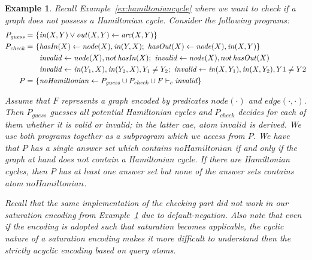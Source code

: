 \documentclass[11pt,fleqn,twoside]{article}
\def\naf{\ensuremath{\mathop{not}}}
\newtheorem{example}{Example}
\begin{document}
			\begin{example}
				\label{ex:hamiltoniancycleqa}
				Recall Example~\ref{ex:hamiltoniancycle} where we want to check if a graph does not possess a Hamiltonian cycle.
				Consider the following programs:
				\begin{align}
					P_{\mathit{guess}} = & \ \{ \mathit{in}(X,Y) \vee \mathit{out}(X,Y) \leftarrow \mathit{arc}(X,Y) \} \label{ex:hamiltoniancycleqa:1} \\
					P_{\mathit{check}} = & \ \{ \mathit{hasIn}(X) \leftarrow \mathit{node}(X), \mathit{in}(Y,X); \ \mathit{hasOut}(X) \leftarrow \mathit{node}(X), \mathit{in}(X,Y) \} \label{ex:hamiltoniancycleqa:2} \\
										& \ \phantom{\{} \mathit{invalid} \leftarrow \mathit{node}(X), \naf \mathit{hasIn}(X); \ \mathit{invalid} \leftarrow \mathit{node}(X), \naf \mathit{hasOut}(X) \label{ex:hamiltoniancycleqa:5} \\
										& \ \phantom{\{} \mathit{invalid} \leftarrow \mathit{in}(Y_1,X), \mathit{in}(Y_2,X), Y_1 \not= Y_2; \ \mathit{invalid} \leftarrow \mathit{in}(X,Y_1), \mathit{in}(X,Y_2), Y1 \not= Y2 \label{ex:hamiltoniancycleqa:4} \\
					P = & \ \{ \mathit{noHamiltonian} \leftarrow \queryatom{c}{P_{\mathit{guess}} \cup P_{\mathit{check}} \cup F}{\mathit{invalid}}{} \}
				\end{align}

				Assume that $F$ represents a graph encoded by predicates $\mathit{node}(\cdot)$ and $\mathit{edge}(\cdot, \cdot)$.
				Then $P_{\mathit{guess}}$ guesses all potential Hamiltonian cycles and $P_{\mathit{check}}$ decides for each of them whether it is valid or invalid;
				in the latter cae, atom $\mathit{invalid}$ is derived.
				We use both programs together as a subprogram which we access from $P$.
				We have that $P$ has a single answer set which contains $\mathit{noHamiltonian}$ if and only if the graph at hand does not contain a Hamiltonian cycle.
				If there are Hamiltonian cycles, then $P$ has at least one answer set but none of the answer sets contains atom $\mathit{noHamiltonian}$.

				Recall that the same implementation of the checking part did not work in our saturation encoding from Example~\ref{ex:hamiltoniancycleqa} due to default-negation.
				Also note that even if the encoding is adopted such that saturation becomes applicable, the cyclic nature of a saturation encoding
				makes it more difficult to understand then the strictly acyclic encoding based on query atoms.
			\end{example}
\end{document}
